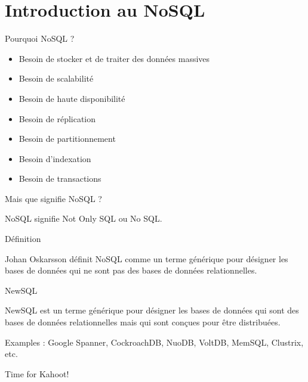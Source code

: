 \section{Introduction au NoSQL}

\begin{frame}{Pourquoi NoSQL ?}

    \begin{itemize}
        \item Besoin de stocker et de traiter des données massives
        \item Besoin de scalabilité
        \item Besoin de haute disponibilité
        \item Besoin de réplication
        \item Besoin de partitionnement
        \item Besoin d'indexation
        \item Besoin de transactions
    \end{itemize}

\end{frame}

\begin{frame}{Mais que signifie NoSQL ?}

    NoSQL signifie Not Only SQL ou No SQL.

\end{frame}

\begin{frame}{Définition}

    Johan Oskarsson définit NoSQL comme un terme générique pour désigner les bases de données qui ne sont pas des bases de données relationnelles.

\end{frame}


\begin{frame}{NewSQL}

    NewSQL est un terme générique pour désigner les bases de données qui sont des bases de données relationnelles mais qui sont conçues pour être distribuées.

    Examples : Google Spanner, CockroachDB, NuoDB, VoltDB, MemSQL, Clustrix, etc.
\end{frame}

\begin{frame}[standout]
    
Time for Kahoot!

\end{frame}